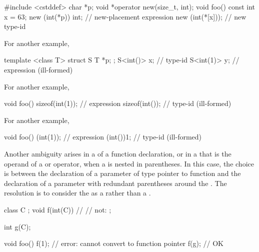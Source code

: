 \pnum
\enterexample

\begin{codeblock}
#include <cstddef>
char *p;
void *operator new(size_t, int);
void foo()  {
	const int x = 63;
	new (int(*p)) int;      // new-placement expression
	new (int(*[x]));        // new type-id
}
\end{codeblock}

\pnum
For another example,

\begin{codeblock}
template <class T>
struct S {
	T *p;
};
S<int()> x;                     // type-id
S<int(1)> y;                    // expression (ill-formed)
\end{codeblock}

\pnum
For another example,

\begin{codeblock}
void foo()
{
	sizeof(int(1));         // expression
	sizeof(int());          // type-id (ill-formed)
}
\end{codeblock}

\pnum
For another example,

\begin{codeblock}
void foo()
{
	(int(1));               // expression
	(int())1;               // type-id (ill-formed)
}
\end{codeblock}
\exitexampleb

\pnum
Another ambiguity arises in a
of a function declaration, or in a
that is the operand of a
or
operator, when a
is nested in parentheses.
In this case, the choice is between the declaration of a parameter of type
pointer to function and the declaration of a parameter with redundant
parentheses around the
.
The resolution is to consider the
as a
rather than a
.
\enterexample

\begin{codeblock}
class C { };
void f(int(C)) { }              // 
                                // not: ;

int g(C);

void foo() {
	f(1);                   // error: cannot convert  to function pointer
	f(g);                   // OK
}
\end{codeblock}

